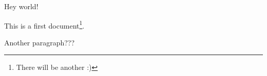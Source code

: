 \documentclass[a4paper, 12pt]{article} %
\begin{document}
Hey world!

This is a first document\footnote{There will be another :)}.

Another paragraph???
\end{document}
